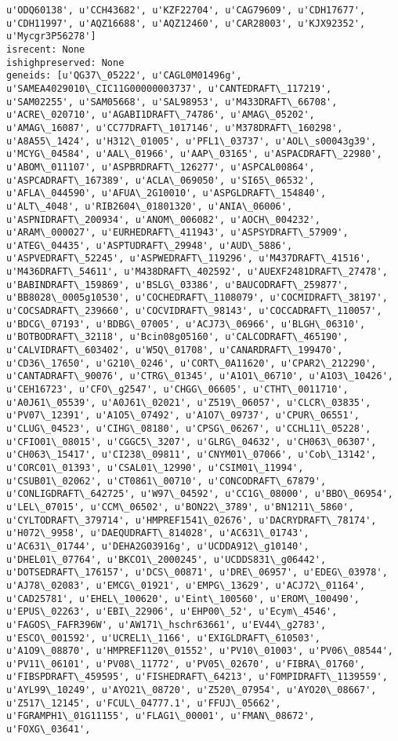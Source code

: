 \documentclass[11pt]{article}
\begin{document}
\begin{Verbatim}[commandchars=\\\{\}]
u'ODQ60138', u'CCH43682', u'KZF22704', u'CAG79609', u'CDH17677', u'CDH11997', u'AQZ16688', u'AQZ12460', u'CAR28003', u'KJX92352', u'Mycgr3P56278']
isrecent: None
ishighpreserved: None
geneids: [u'QG37\_05222', u'CAGL0M01496g', u'SAMEA4029010\_CIC11G00000003737', u'CANTEDRAFT\_117219', u'SAM02255', u'SAM05668', u'SAL98953', u'M433DRAFT\_66708', u'ACRE\_020710', u'AGABI1DRAFT\_74786', u'AMAG\_05202', u'AMAG\_16087', u'CC77DRAFT\_1017146', u'M378DRAFT\_160298', u'A8A55\_1424', u'H312\_01005', u'PFL1\_03737', u'AOL\_s00043g39', u'MCYG\_04584', u'AAL\_01966', u'AAP\_03165', u'ASPACDRAFT\_22980', u'ABOM\_011107', u'ASPBRDRAFT\_126277', u'ASPCAL00864', u'ASPCADRAFT\_167389', u'ACLA\_069050', u'SI65\_06532', u'AFLA\_044590', u'AFUA\_2G10010', u'ASPGLDRAFT\_154840', u'ALT\_4048', u'RIB2604\_01801320', u'ANIA\_06006', u'ASPNIDRAFT\_200934', u'ANOM\_006082', u'AOCH\_004232', u'ARAM\_000027', u'EURHEDRAFT\_411943', u'ASPSYDRAFT\_57909', u'ATEG\_04435', u'ASPTUDRAFT\_29948', u'AUD\_5886', u'ASPVEDRAFT\_52245', u'ASPWEDRAFT\_119296', u'M437DRAFT\_41516', u'M436DRAFT\_54611', u'M438DRAFT\_402592', u'AUEXF2481DRAFT\_27478', u'BABINDRAFT\_159869', u'BSLG\_03386', u'BAUCODRAFT\_259877', u'BB8028\_0005g10530', u'COCHEDRAFT\_1108079', u'COCMIDRAFT\_38197', u'COCSADRAFT\_239660', u'COCVIDRAFT\_98143', u'COCCADRAFT\_110057', u'BDCG\_07193', u'BDBG\_07005', u'ACJ73\_06966', u'BLGH\_06310', u'BOTBODRAFT\_32118', u'Bcin08g05160', u'CALCODRAFT\_465190', u'CALVIDRAFT\_603402', u'W5Q\_01708', u'CANARDRAFT\_199470', u'CD36\_17650', u'G210\_0246', u'CORT\_0A11620', u'CPAR2\_212290', u'CANTADRAFT\_90076', u'CTRG\_01345', u'A1O1\_06710', u'A1O3\_10426', u'CEH16723', u'CFO\_g2547', u'CHGG\_06605', u'CTHT\_0011710', u'A0J61\_05539', u'A0J61\_02021', u'Z519\_06057', u'CLCR\_03835', u'PV07\_12391', u'A1O5\_07492', u'A1O7\_09737', u'CPUR\_06551', u'CLUG\_04523', u'CIHG\_08180', u'CPSG\_06267', u'CCHL11\_05228', u'CFIO01\_08015', u'CGGC5\_3207', u'GLRG\_04632', u'CH063\_06307', u'CH063\_15417', u'CI238\_09811', u'CNYM01\_07066', u'Cob\_13142', u'CORC01\_01393', u'CSAL01\_12990', u'CSIM01\_11994', u'CSUB01\_02062', u'CT0861\_00710', u'CONCODRAFT\_67879', u'CONLIGDRAFT\_642725', u'W97\_04592', u'CC1G\_08000', u'BBO\_06954', u'LEL\_07015', u'CCM\_06502', u'BON22\_3789', u'BN1211\_5860', u'CYLTODRAFT\_379714', u'HMPREF1541\_02676', u'DACRYDRAFT\_78174', u'H072\_9958', u'DAEQUDRAFT\_814028', u'AC631\_01743', u'AC631\_01744', u'DEHA2G03916g', u'UCDDA912\_g10140', u'DHEL01\_07764', u'BKCO1\_2000245', u'UCDDS831\_g06442', u'DOTSEDRAFT\_176157', u'DCS\_00871', u'DRE\_06957', u'EDEG\_03978', u'AJ78\_02083', u'EMCG\_01921', u'EMPG\_13629', u'ACJ72\_01164', u'CAD25781', u'EHEL\_100620', u'Eint\_100560', u'EROM\_100490', u'EPUS\_02263', u'EBI\_22906', u'EHP00\_52', u'Ecym\_4546', u'FAGOS\_FAFR396W', u'AW171\_hschr63661', u'EV44\_g2783', u'ESCO\_001592', u'UCREL1\_1166', u'EXIGLDRAFT\_610503', u'A1O9\_08870', u'HMPREF1120\_01552', u'PV10\_01003', u'PV06\_08544', u'PV11\_06101', u'PV08\_11772', u'PV05\_02670', u'FIBRA\_01760', u'FIBSPDRAFT\_459595', u'FISHEDRAFT\_64213', u'FOMPIDRAFT\_1139559', u'AYL99\_10249', u'AYO21\_08720', u'Z520\_07954', u'AYO20\_08667', u'Z517\_12145', u'FCUL\_04777.1', u'FFUJ\_05662', u'FGRAMPH1\_01G11155', u'FLAG1\_00001', u'FMAN\_08672', u'FOXG\_03641', 
\end{Verbatim}
\end{document}
